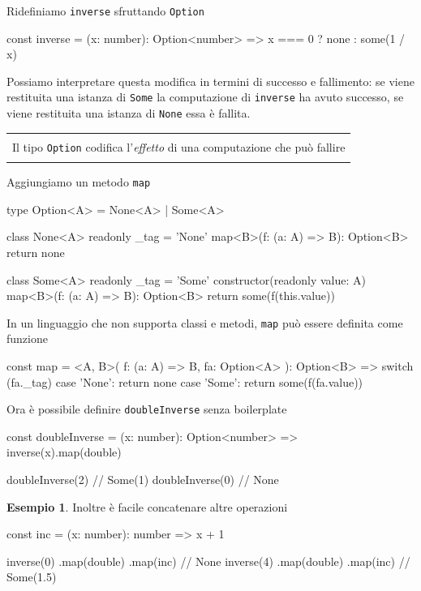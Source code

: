 \documentclass[12pt]{article}
\theoremstyle{definition}
\newtheorem{example}{Esempio}[section]
\newenvironment{demo}
    {\begin{center}
    \begin{tabular}{|p{0.9\textwidth}|}
    \hline\\
    }
    {
    \\\\\hline
    \end{tabular}
    \end{center}
    }
\newenvironment{code}
  {\vspace{0.5cm} \VerbatimEnvironment\begin{typescriptcode}}
  {\end{typescriptcode} \vspace{0.2cm}}
\begin{document}
Ridefiniamo \texttt{inverse} sfruttando \texttt{Option}

\begin{code}
const inverse = (x: number): Option<number> =>
  x === 0 ? none : some(1 / x)
\end{code}

Possiamo interpretare questa modifica in termini di successo e fallimento: se viene restituita una istanza di \texttt{Some}
la computazione di \texttt{inverse} ha avuto successo, se viene restituita una istanza di \texttt{None} essa è fallita.

\begin{demo}
Il tipo \texttt{Option} codifica l'\emph{effetto} di una computazione che può fallire
\end{demo}

Aggiungiamo un metodo \texttt{map}

\begin{code}
type Option<A> = None<A> | Some<A>

class None<A> {
  readonly _tag = 'None'
  map<B>(f: (a: A) => B): Option<B> {
    return none
  }
}

class Some<A> {
  readonly _tag = 'Some'
  constructor(readonly value: A) {}
  map<B>(f: (a: A) => B): Option<B> {
    return some(f(this.value))
  }
}
\end{code}

In un linguaggio che non supporta classi e metodi, \texttt{map} può essere definita come funzione

\begin{code}
const map = <A, B>(
  f: (a: A) => B,
  fa: Option<A>
): Option<B> => {
  switch (fa._tag) {
    case 'None':
      return none
    case 'Some':
      return some(f(fa.value))
  }
}
\end{code}


Ora è possibile definire \texttt{doubleInverse} senza boilerplate

\begin{code}
const doubleInverse = (x: number): Option<number> =>
  inverse(x).map(double)

doubleInverse(2) // Some(1)
doubleInverse(0) // None
\end{code}

\begin{example}
Inoltre è facile concatenare altre operazioni

\begin{code}
const inc = (x: number): number => x + 1

inverse(0)
  .map(double)
  .map(inc) // None
inverse(4)
  .map(double)
  .map(inc) // Some(1.5)
\end{code}
\end{example}
\end{document}
